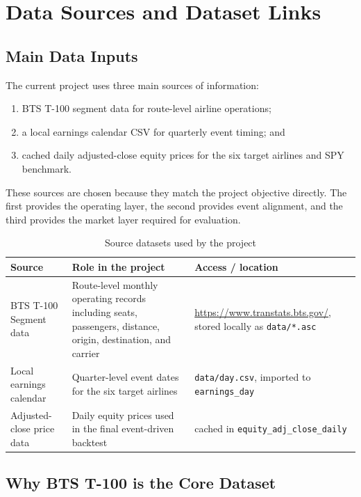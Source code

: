 \documentclass[11pt,a4paper]{article}
\begin{document}
\section{Data Sources and Dataset Links}

\subsection{Main Data Inputs}

The current project uses three main sources of information:

\begin{enumerate}[leftmargin=*, label=(\arabic*)]
  \item BTS T-100 segment data for route-level airline operations;
  \item a local earnings calendar CSV for quarterly event timing; and
  \item cached daily adjusted-close equity prices for the six target airlines
  and SPY benchmark.
\end{enumerate}

These sources are chosen because they match the project objective directly. The
first provides the operating layer, the second provides event alignment, and
the third provides the market layer required for evaluation.

\begin{table}[H]
\centering\small
\caption{Source datasets used by the project}
\label{tab:source_summary}
\begin{tabularx}{\textwidth}{l X X}
\toprule
\textbf{Source} & \textbf{Role in the project} & \textbf{Access / location} \\
\midrule
BTS T-100 Segment data & Route-level monthly operating records including seats, passengers, distance, origin, destination, and carrier & \href{https://www.transtats.bts.gov/}{https://www.transtats.bts.gov/}, stored locally as \texttt{data/*.asc} \\
Local earnings calendar & Quarter-level event dates for the six target airlines & \texttt{data/day.csv}, imported to \texttt{earnings\_day} \\
Adjusted-close price data & Daily equity prices used in the final event-driven backtest & cached in \texttt{equity\_adj\_close\_daily} \\
\bottomrule
\end{tabularx}
\end{table}

\subsection{Why BTS T-100 is the Core Dataset}
\end{document}
